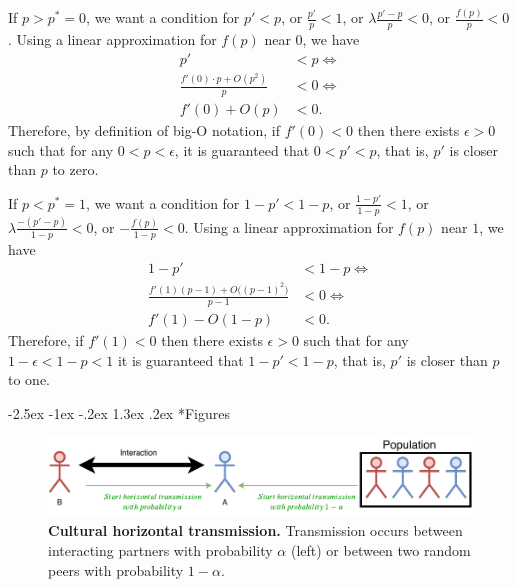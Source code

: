 \documentclass[12pt]{extarticle}
\makeatletter
\renewcommand\section{\@startsection {section}{1}{\z@}%
     {-2.5ex \@plus -1ex \@minus -.2ex}%
     {1.3ex \@plus.2ex}%
    {\Large\bfseries}}
\makeatother
\begin{document}
{\begin{appendices}
If $p>p^*=0$, we want a condition for $p'<p$, or
$\frac{p'}{p}<1$, or
$\lambda \frac{p'-p}{p} < 0$, or
$\frac{f(p)}{p} < 0$.
Using a linear approximation for $f(p)$ near $0$, we have
\begin{equation}\begin{aligned}
p' &< p \Leftrightarrow \\
\frac{f'(0) \cdot p + O(p^2)}{p} &< 0 \Leftrightarrow \\
f'(0) + O(p) &< 0.
\end{aligned}\end{equation}
Therefore, by definition of big-O notation, if $f'(0)<0$ then there exists $\epsilon>0$ such that for any $0<p<\epsilon$, it is guaranteed that $0<p'<p$, that is, $p'$ is closer than $p$ to zero.

If $p<p^*=1$, we want a condition for $1-p' < 1-p$, or
$\frac{1-p'}{1-p}<1$, or
$\lambda \frac{-(p'-p)}{1-p} < 0$, or
$-\frac{f(p)}{1-p} < 0$.
Using a linear approximation for $f(p)$ near $1$, we have
\begin{equation}\begin{aligned}
1-p' &< 1-p  \Leftrightarrow \\
\frac{f'(1)(p-1) + O\big((p-1)^2\big)}{p-1} &< 0 \Leftrightarrow \\
f'(1) - O(1-p) &< 0.
\end{aligned}\end{equation}
Therefore, if $f'(1)<0$ then there exists $\epsilon>0$ such that for any $1-\epsilon<1-p<1$ it is guaranteed that $1-p'<1-p$, that is, $p'$ is closer than $p$ to one.
\end{appendices}






\section*{Figures}
\begin{figure}[thb]
  \centering
  \includegraphics[scale=1]{figure1.pdf}
  \caption{\textbf{Cultural horizontal transmission.} Transmission occurs between interacting partners with probability $\alpha$ (left) or between two random peers with probability $1-\alpha$.}
  \label{fig:horizontal}
\end{figure}



}
\end{document}
